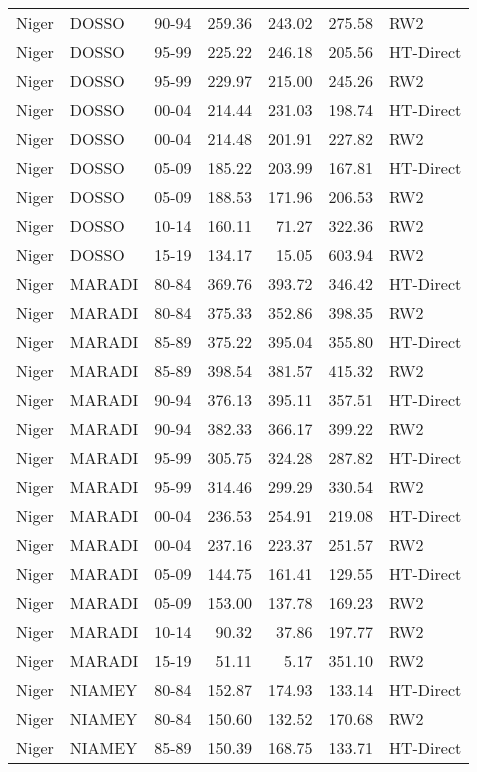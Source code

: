 \begin{longtable}{lllrrrl}
  Niger & DOSSO & 90-94 & 259.36 & 243.02 & 275.58 & RW2 \\ 
  Niger & DOSSO & 95-99 & 225.22 & 246.18 & 205.56 & HT-Direct \\ 
  Niger & DOSSO & 95-99 & 229.97 & 215.00 & 245.26 & RW2 \\ 
  Niger & DOSSO & 00-04 & 214.44 & 231.03 & 198.74 & HT-Direct \\ 
  Niger & DOSSO & 00-04 & 214.48 & 201.91 & 227.82 & RW2 \\ 
  Niger & DOSSO & 05-09 & 185.22 & 203.99 & 167.81 & HT-Direct \\ 
  Niger & DOSSO & 05-09 & 188.53 & 171.96 & 206.53 & RW2 \\ 
  Niger & DOSSO & 10-14 & 160.11 & 71.27 & 322.36 & RW2 \\ 
  Niger & DOSSO & 15-19 & 134.17 & 15.05 & 603.94 & RW2 \\ 
  Niger & MARADI & 80-84 & 369.76 & 393.72 & 346.42 & HT-Direct \\ 
  Niger & MARADI & 80-84 & 375.33 & 352.86 & 398.35 & RW2 \\ 
  Niger & MARADI & 85-89 & 375.22 & 395.04 & 355.80 & HT-Direct \\ 
  Niger & MARADI & 85-89 & 398.54 & 381.57 & 415.32 & RW2 \\ 
  Niger & MARADI & 90-94 & 376.13 & 395.11 & 357.51 & HT-Direct \\ 
  Niger & MARADI & 90-94 & 382.33 & 366.17 & 399.22 & RW2 \\ 
  Niger & MARADI & 95-99 & 305.75 & 324.28 & 287.82 & HT-Direct \\ 
  Niger & MARADI & 95-99 & 314.46 & 299.29 & 330.54 & RW2 \\ 
  Niger & MARADI & 00-04 & 236.53 & 254.91 & 219.08 & HT-Direct \\ 
  Niger & MARADI & 00-04 & 237.16 & 223.37 & 251.57 & RW2 \\ 
  Niger & MARADI & 05-09 & 144.75 & 161.41 & 129.55 & HT-Direct \\ 
  Niger & MARADI & 05-09 & 153.00 & 137.78 & 169.23 & RW2 \\ 
  Niger & MARADI & 10-14 & 90.32 & 37.86 & 197.77 & RW2 \\ 
  Niger & MARADI & 15-19 & 51.11 & 5.17 & 351.10 & RW2 \\ 
  Niger & NIAMEY & 80-84 & 152.87 & 174.93 & 133.14 & HT-Direct \\ 
  Niger & NIAMEY & 80-84 & 150.60 & 132.52 & 170.68 & RW2 \\ 
  Niger & NIAMEY & 85-89 & 150.39 & 168.75 & 133.71 & HT-Direct \\ 

\end{longtable}
